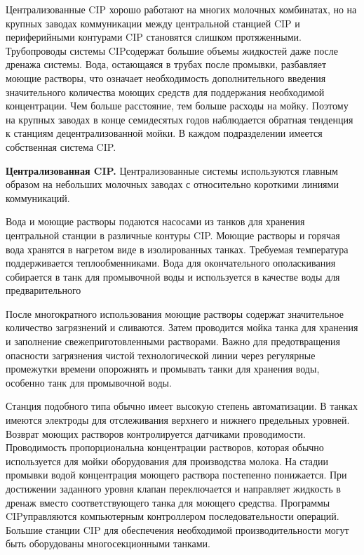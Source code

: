 {\par \redline Централизованные CIP хорошо работают на многих молочных комбинатах, но на крупных заводах коммуникации между центральной станцией CIP и периферийными контурами CIP становятся слишком протяженными. Трубопроводы системы CIPсодержат большие объемы жидкостей даже после дренажа системы. Вода, остающаяся в трубах после промывки, разбавляет моющие растворы, что означает необходимость дополнительного введения значительного количества моющих средств для поддержания необходимой концентрации. Чем больше расстояние, тем больше расходы на мойку. Поэтому на крупных заводах в конце семидесятых годов наблюдается обратная тенденция к станциям децентрализованной мойки. В каждом подразделении имеется собственная система CIP. 


\par \redline \textbf{Централизованная CIP.} Централизованные системы используются главным образом на небольших молочных заводах с относительно короткими линиями коммуникаций.

\par \redline Вода и моющие растворы подаются насосами из танков для хранения центральной станции в различные контуры CIP.
Моющие растворы и горячая вода хранятся в нагретом виде в изолированных танках. Требуемая температура поддерживается теплообменниками. Вода для окончательного ополаскивания собирается в танк для промывочной воды и используется в качестве воды для предварительного

\par \redline После многократного использования моющие растворы содержат значительное количество загрязнений и сливаются. Затем проводится мойка танка для хранения и заполнение свежеприготовленными растворами. Важно для предотвращения опасности загрязнения чистой технологической линии через регулярные промежутки времени опорожнять и промывать танки для хранения воды, особенно танк для промывочной воды.

\par \redline Станция подобного типа обычно имеет высокую степень автоматизации. В танках имеются электроды для отслеживания верхнего и нижнего предельных уровней. Возврат моющих растворов контролируется датчиками проводимости. Проводимость пропорциональна концентрации растворов, которая обычно используется для мойки оборудования для производства молока. На стадии промывки водой концентрация моющего раствора постепенно понижается. При достижении заданного уровня клапан переключается и направляет жидкость в дренаж вместо соответствующего танка для моющего средства. Программы CIPуправляются компьютерным контроллером последовательности операций. Большие станции CIP для обеспечения необходимой производительности могут быть оборудованы многосекционными танками.

}
